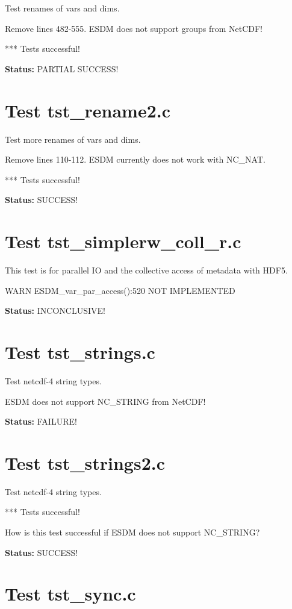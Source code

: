 Test renames of vars and dims.

Remove lines 482-555. ESDM does not support groups from NetCDF!

*** Tests successful!

{\bf \large Status: } PARTIAL SUCCESS!

\section{Test tst\_rename2.c}

Test more renames of vars and dims.

Remove lines 110-112. ESDM currently does not work with NC\_NAT.

*** Tests successful!

{\bf \large Status: } SUCCESS!

\section{Test tst\_simplerw\_coll\_r.c}

This test is for parallel IO and the collective access of metadata with HDF5.

WARN ESDM\_var\_par\_access():520 NOT IMPLEMENTED

{\bf \large Status: } INCONCLUSIVE!

\section{Test tst\_strings.c}

Test netcdf-4 string types.

ESDM does not support NC\_STRING from NetCDF!

{\bf \large Status: } FAILURE!

\section{Test tst\_strings2.c}

Test netcdf-4 string types.

*** Tests successful!

How is this test successful if ESDM does not support NC\_STRING?

{\bf \large Status: } SUCCESS!

\section{Test tst\_sync.c}

